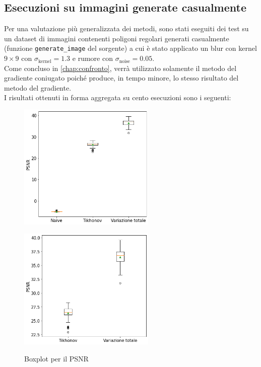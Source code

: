 \documentclass[11pt]{article}
\begin{document}
\subsection{Esecuzioni su immagini generate casualmente}
Per una valutazione più generalizzata dei metodi, sono stati eseguiti dei test su un dataset di immagini contenenti poligoni regolari generati casualmente (funzione \texttt{generate\_image} del sorgente)
a cui è stato applicato un blur con kernel $9 \times 9$ con $\sigma_{\text{kernel}}=1.3$ e rumore con $\sigma_{\text{noise}}=0.05$.\\
Come concluso in \autoref{chap:confronto}, verrà utilizzato solamente il metodo del gradiente coniugato poiché produce, in tempo minore, lo stesso risultato del metodo del gradiente.\\
I risultati ottenuti in forma aggregata su cento esecuzioni sono i seguenti:
\begin{figure}[H]
    \centering
    \begin{minipage}{0.45\textwidth}
        \centering
        \includegraphics[width=6.5cm]{esecuzioni_multiple/100/psnr1.png}
        \label{fig:100_psnr1}
    \end{minipage}\hfill
    \begin{minipage}{0.45\textwidth}
        \centering
        \includegraphics[width=6.5cm]{esecuzioni_multiple/100/psnr2.png}
        \label{fig:100_psnr2}
    \end{minipage}
    \caption{Boxplot per il PSNR}
\end{figure}
\end{document}
